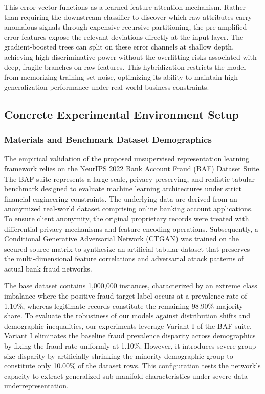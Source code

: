 This error vector functions as a learned feature attention mechanism. Rather than requiring the downstream classifier to discover which raw attributes carry anomalous signals through expensive recursive partitioning, the pre-amplified error features expose the relevant deviations directly at the input layer. The gradient-boosted trees can split on these error channels at shallow depth, achieving high discriminative power without the overfitting risks associated with deep, fragile branches on raw features. This hybridization restricts the model from memorizing training-set noise, optimizing its ability to maintain high generalization performance under real-world business constraints.

\subsection{Concrete Experimental Environment Setup}

\subsubsection{Materials and Benchmark Dataset Demographics}

The empirical validation of the proposed unsupervised representation learning framework relies on the NeurIPS 2022 Bank Account Fraud (BAF) Dataset Suite. The BAF suite represents a large-scale, privacy-preserving, and realistic tabular benchmark designed to evaluate machine learning architectures under strict financial engineering constraints. The underlying data are derived from an anonymized real-world dataset comprising online banking account applications. To ensure client anonymity, the original proprietary records were treated with differential privacy mechanisms and feature encoding operations. Subsequently, a Conditional Generative Adversarial Network (CTGAN) was trained on the secured source matrix to synthesize an artificial tabular dataset that preserves the multi-dimensional feature correlations and adversarial attack patterns of actual bank fraud networks.

The base dataset contains 1,000,000 instances, characterized by an extreme class imbalance where the positive fraud target label occurs at a prevalence rate of 1.10\%, whereas legitimate records constitute the remaining 98.90\% majority share. To evaluate the robustness of our models against distribution shifts and demographic inequalities, our experiments leverage Variant I of the BAF suite. Variant I eliminates the baseline fraud prevalence disparity across demographics by fixing the fraud rate uniformly at 1.10\%. However, it introduces severe group size disparity by artificially shrinking the minority demographic group to constitute only 10.00\% of the dataset rows. This configuration tests the network's capacity to extract generalized sub-manifold characteristics under severe data underrepresentation.

